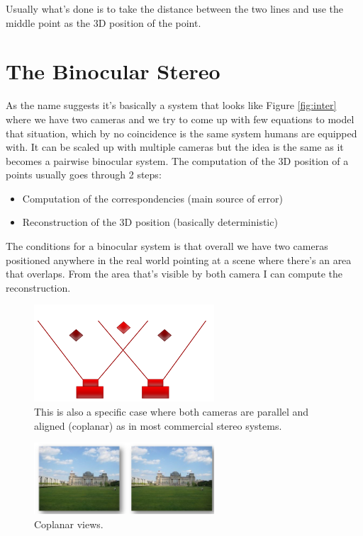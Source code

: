 Usually what's done is to take the distance between the two lines and use the middle point as the 3D position of the point. 

\section{The Binocular Stereo}

As the name suggests it's basically a system that looks like Figure \ref{fig:inter} where we have two cameras and we try to come up with few equations to model that situation, which by no coincidence is the same system humans are equipped with. It can be scaled up with multiple cameras but the idea is the same as it becomes a pairwise binocular system. The computation of the 3D position of a points usually goes through 2 steps:

\begin{itemize}
    \item Computation of the correspondencies (main source of error)
    \item Reconstruction of the 3D position (basically deterministic)
\end{itemize}

The conditions for a binocular system is that overall we have two cameras positioned anywhere in the real world pointing at a scene where there's an area that overlaps. From the area that's visible by both camera I can compute the reconstruction.

\begin{figure}[H]
    \centering
    \includegraphics[width=0.6\textwidth]{Figures/binoc.png}
    \caption{This is also a specific case where both cameras are parallel and aligned (coplanar) as in most commercial stereo systems.}
    \label{fig:binoc}
\end{figure}




\begin{figure}[h!]
    \centering
    \includegraphics[width=0.6\textwidth]{Figures/coplan.png}
    \caption{Coplanar views.}
    \label{fig:coplan}
\end{figure}

